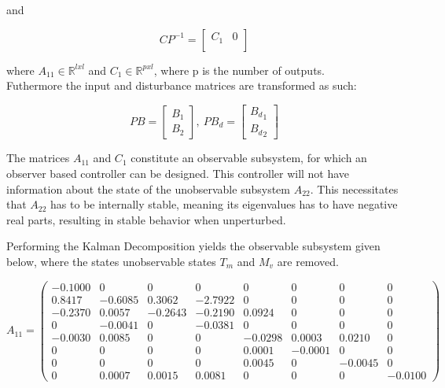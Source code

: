 and

\begin{equation}
	CP^{-1} = \begin{bmatrix}
		C_{1}       & 0 \\
	\end{bmatrix}
\end{equation}

where $A_{11} \in \mathbb{R} ^{l x l}$ and $C_{1} \in \mathbb{R} ^{p x l}$, where p is the number of outputs.\\Futhermore the input and disturbance matrices are transformed as such:

\begin{equation}
	PB = \begin{bmatrix}
		B_1 \\
		B_2
	\end{bmatrix}, \
	PB_d = \begin{bmatrix}
		{B_d}_1 \\
		{B_d}_2
	\end{bmatrix}
\end{equation}


The matrices $A_{11}$ and $C_{1}$ constitute an observable subsystem, for which an observer based controller can be designed. This controller will not have information about the state of the unobservable subsystem $A_{22}$. This necessitates that $A_{22}$ has to be internally stable, meaning its eigenvalues has to have negative real parts, resulting in stable behavior when unperturbed.

Performing the Kalman Decomposition yields the observable subsystem given below, where the states unobservable states $ T_m $ and $ M_v $ are removed.

\begin{equation}  \label{eq:A11}
	A_{11} = \left(\begin{array}{cccccccc}
		-0.1000 &        0 &        0 &        0 &        0 &        0 &        0 &        0  \\
		0.8417 &  -0.6085 &   0.3062 &  -2.7922 &        0 &        0 &        0 &        0  \\
		-0.2370 &   0.0057 &  -0.2643 &  -0.2190 &   0.0924 &        0 &        0 &        0  \\
		0 &  -0.0041 &        0 &  -0.0381 &        0 &        0 &        0 &        0  \\
		-0.0030 &   0.0085 &        0 &        0 &  -0.0298 &   0.0003 &   0.0210 &        0  \\
		0 &        0 &        0 &        0 &   0.0001 &  -0.0001 &        0 &        0  \\
		0 &        0 &        0 &        0 &   0.0045 &        0 &  -0.0045 &        0  \\
		0 &   0.0007 &   0.0015 &   0.0081 &        0 &        0 &        0 &  -0.0100
	\end{array}\right)
\end{equation}

